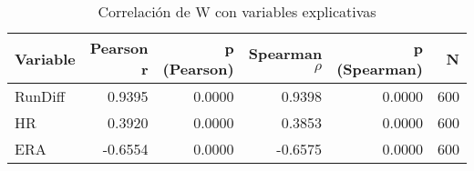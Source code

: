 \begin{center}
    \begin{table}
        \caption{Correlación de W con variables explicativas}
        \label{tab:corr_w_x}
        \begin{tabular}{lrrrrr}
            \toprule
            Variable & Pearson r & p (Pearson) & Spearman $\rho$ & p (Spearman) & N \\
            \midrule
            RunDiff & 0.9395 & 0.0000 & 0.9398 & 0.0000 & 600 \\
            HR & 0.3920 & 0.0000 & 0.3853 & 0.0000 & 600 \\
            ERA & -0.6554 & 0.0000 & -0.6575 & 0.0000 & 600 \\
            \bottomrule
        \end{tabular}
    \end{table}
\end{center}
